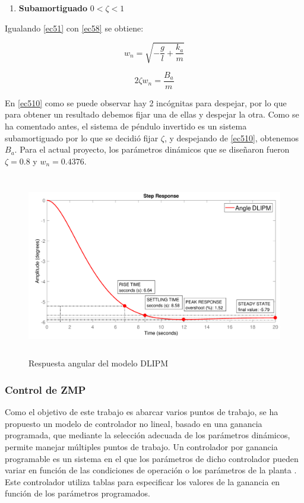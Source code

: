 \begin{itemize}
\begin{enumerate}
\item \textbf{Subamortiguado} $0 < \zeta < 1$

\end{enumerate}

Igualando \ref{ec51} con \ref{ec58} se obtiene:

\begin{equation}
w_{n}=\sqrt{-\frac{g}{l}+\frac{k_a}{m}}
\label{ec59}
\end{equation}

\begin{equation}
2\zeta w_{n} = \frac{B_a}{m}
\label{ec510}
\end{equation}

En \ref{ec510} como se puede observar hay 2 incógnitas para despejar, por lo que para obtener un resultado debemos fijar una de ellas y despejar la otra. Como se ha comentado antes, el sistema de péndulo invertido es un sistema subamortiguado por lo que se decidió fijar $\zeta$, y despejando de \ref{ec510}, obtenemos $B_a$. Para el actual proyecto, los parámetros dinámicos que se diseñaron fueron $\zeta = 0.8$ y $w_n = 0.4376$.

\begin{figure}[H]
\centering
\includegraphics[width=13cm, height=8cm]{imagenes/apartado_5/59_step_response}
\caption{Respuesta angular del modelo DLIPM}
\label{figura511}
\end{figure}

\end{itemize}


\subsubsection{Control de ZMP}

Como el objetivo de este trabajo es abarcar varios puntos de trabajo, se ha propuesto un modelo de controlador no lineal, basado en una ganancia programada, que mediante la selección adecuada de los parámetros dinámicos, permite manejar múltiples puntos de trabajo. Un controlador por ganancia programable es un sistema en el que los parámetros de dicho controlador pueden variar en función de las condiciones de operación o los parámetros de la planta \cite{ref22}. Este controlador utiliza tablas para especificar los valores de la ganancia en función de los parámetros programados.

